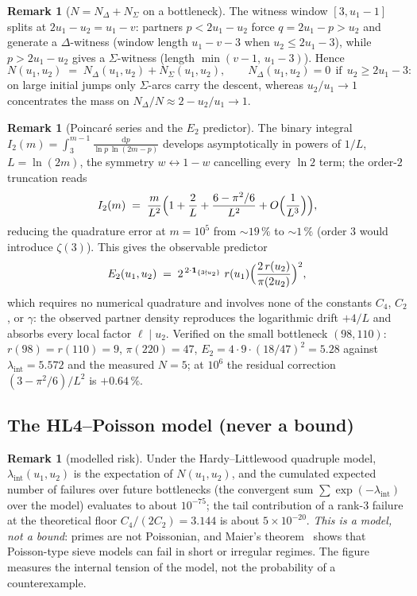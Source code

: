 \documentclass[11pt]{article}
\theoremstyle{plain}
\theoremstyle{definition}
\newtheorem{remark}[theorem]{Remark}
\newcommand{\rch}{r}
\newcommand{\lam}{\lambda_{\mathrm{int}}}
\newcommand{\dd}{\mathrm{d}}
\begin{document}
\begin{remark}[$N = N_\Delta + N_\Sigma$ on a bottleneck]
\label{rem:Nsplit}
The witness window $[3, u_1 - 1]$ splits at
$2u_1 - u_2 = u_1 - v$: partners $p < 2u_1 - u_2$ force
$q = 2u_1 - p > u_2$ and generate a $\Delta$-witness (window
length $u_1 - v - 3$ when $u_2 \le 2u_1 - 3$), while
$p > 2u_1 - u_2$ gives a $\Sigma$-witness (length
$\min(v - 1,\, u_1 - 3)$). Hence
\[
N(u_1,u_2) \;=\; N_\Delta(u_1,u_2) + N_\Sigma(u_1,u_2),
\qquad
N_\Delta(u_1,u_2) = 0 \ \ \text{if}\ \ u_2 \ge 2u_1 - 3 :
\]
on large initial jumps only $\Sigma$-arcs carry the descent,
whereas $u_2/u_1 \to 1$ concentrates the mass on
$N_\Delta / N \approx 2 - u_2/u_1 \to 1$.
\end{remark}

\begin{remark}[Poincar\'e series and the $E_2$ predictor]
\label{rem:poincare}
The binary integral $I_2(m) = \int_3^{m-1} \frac{\dd p}{\ln p\,
\ln(2m-p)}$ develops asymptotically in powers of $1/L$,
$L = \ln(2m)$, the symmetry $w \leftrightarrow 1 - w$ cancelling
every $\ln 2$ term; the order-$2$ truncation reads
\[
I_2(m) \;=\; \frac{m}{L^2}\Bigl(1 + \frac{2}{L}
 + \frac{6 - \pi^2/6}{L^2} + O\Bigl(\frac{1}{L^3}\Bigr)\Bigr),
\]
reducing the quadrature error at $m = 10^{5}$ from $\sim 19\,\%$ to
$\sim 1\,\%$ (order $3$ would introduce $\zeta(3)$). This gives the
observable predictor
\[
E_2(u_1,u_2) \;=\;
2^{\,2 \cdot \mathbf{1}_{\{3 \nmid u_2\}}}\;
\rch(u_1)\Bigl(\frac{2\,\rch(u_2)}{\pi(2u_2)}\Bigr)^{2},
\]
which requires no numerical quadrature and involves none of the
constants $C_4$, $C_2$, or $\gamma$: the observed partner density
reproduces the logarithmic drift $+4/L$ and absorbs every local
factor $\ell \mid u_2$. Verified on the small bottleneck $(98,110)$:
$\rch(98) = \rch(110) = 9$, $\pi(220) = 47$,
$E_2 = 4 \cdot 9 \cdot (18/47)^2 = 5.28$ against $\lam = 5.572$ and
the measured $N = 5$; at $10^{6}$ the residual correction
$(3 - \pi^2/6)/L^2$ is $+0.64\,\%$.
\end{remark}

\subsection{The HL4--Poisson model (never a bound)}

\begin{remark}[modelled risk]\label{rem:model}
Under the Hardy--Littlewood quadruple model, $\lam(u_1,u_2)$ is the
expectation of $N(u_1,u_2)$, and the cumulated expected number of
failures over future bottlenecks (the convergent sum
$\sum \exp(-\lam)$ over the model) evaluates to about $10^{-75}$;
the tail contribution of a rank-$3$ failure at the theoretical floor
$C_4/(2C_2) = 3.144$ is about $5 \times 10^{-20}$. \emph{This is a
model, not a bound}: primes are not Poissonian, and Maier's
theorem~\cite{maier} shows that Poisson-type sieve models can fail
in short or irregular regimes. The figure measures the internal
tension of the model, not the probability of a counterexample.
\end{remark}
\end{document}

